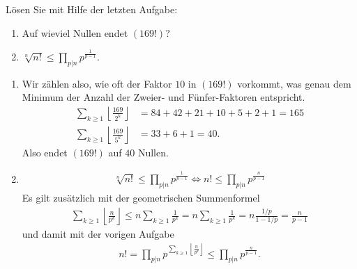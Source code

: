 
\begin{exercise}

Lösen Sie mit Hilfe der letzten Aufgabe:
\begin{enumerate}[label = (\alph*)]
  \item Auf wieviel Nullen endet $(169!)$?
  \item $\sqrt[n]{n!} \leq \prod_{p|n}p^{\frac{1}{p-1}}$.
\end{enumerate}

\end{exercise}


\begin{solution}

\phantom{}

\begin{enumerate}[label = (\alph*)]
  \item Wir zählen also, wie oft der Faktor $10$ in $(169!)$ vorkommt,
  was genau dem Minimum der Anzahl der Zweier- und Fünfer-Faktoren entspricht.
  \begin{align*}
    \sum_{k \geq 1} \left\lfloor \frac{169}{2^k}\right\rfloor
    &= 84 + 42 + 21 + 10 + 5 + 2 + 1 = 165 \\
    \sum_{k \geq 1} \left\lfloor \frac{169}{5^k}\right\rfloor
    &= 33 + 6 + 1 = 40.
  \end{align*}
  Also endet $(169!)$ auf $40$ Nullen.
  \item
  \begin{align*}
    \sqrt[n]{n!} \leq \prod_{p|n}p^{\frac{1}{p-1}}
    \iff n! \leq \prod_{p|n}p^{\frac{n}{p-1}}
  \end{align*}
  Es gilt zusätzlich mit der geometrischen Summenformel
  \begin{align*}
    \sum_{k \geq 1} \left\lfloor \frac{n}{p^k}\right\rfloor
    \leq n\sum_{k \geq 1} \frac{1}{p^k} = n\sum_{k \geq 1} \frac{1}{p^k}
    = n\frac{1/p}{1 - 1/p} = \frac{n}{p - 1}
  \end{align*}
  und damit mit der vorigen Aufgabe
  \begin{align*}
    n! = \prod_{p|n}p^{\sum_{k \geq 1} \left\lfloor \frac{n}{p^k}\right\rfloor}
    \leq \prod_{p|n}p^{\frac{n}{p - 1}}.
  \end{align*}
\end{enumerate}

\end{solution}


